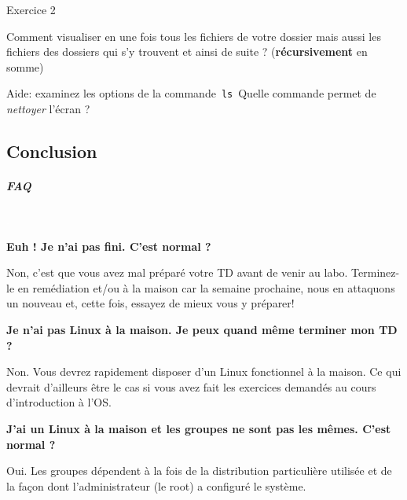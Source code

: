 \documentclass[a4paper,11pt]{article}
\begin{document}
\begin{Exercice}{Exercice 2}
					\textcolor{white}{.} \par

\par

Comment visualiser en une fois tous les fichiers de votre dossier 
mais aussi les fichiers des dossiers qui s'y trouvent et ainsi de suite ? 
(\textbf{r\'ecursivement} en somme)\par

Aide: examinez les options de la commande \,\verb|ls|\,  
Quelle commande permet de \textit{nettoyer} l'\'ecran ?  

\par
	
\end{Exercice}

        \subsection{Conclusion}

\subparagraph{FAQ} 

\textcolor{white}{.} \par

\par
\textbf{Euh ! Je n'ai pas fini. C'est normal ?}
\par

Non, c'est que vous avez mal pr\'epar\'e votre TD avant de venir au labo. 
Terminez-le en rem\'ediation et/ou \`a la maison car la semaine prochaine, 
nous en attaquons un nouveau et, cette fois, essayez de mieux vous y pr\'eparer!  

\par
\textbf{Je n'ai pas Linux \`a la maison. Je peux quand m\^eme terminer mon TD ?}
\par

Non. Vous devrez rapidement disposer d'un Linux fonctionnel \`a la maison.
Ce qui devrait d'ailleurs \^etre le cas si vous avez fait
les exercices demand\'es au cours d'introduction \`a l'OS.

\par
\textbf{J'ai un Linux \`a la maison et les groupes ne sont pas les m\^emes. C'est normal ?}
\par

Oui. 
Les groupes d\'ependent \`a la fois de la distribution particuli\`ere utilis\'ee
et de la fa\c con dont l'administrateur (le root) a configur\'e le syst\`eme.   

\par
\end{document}
